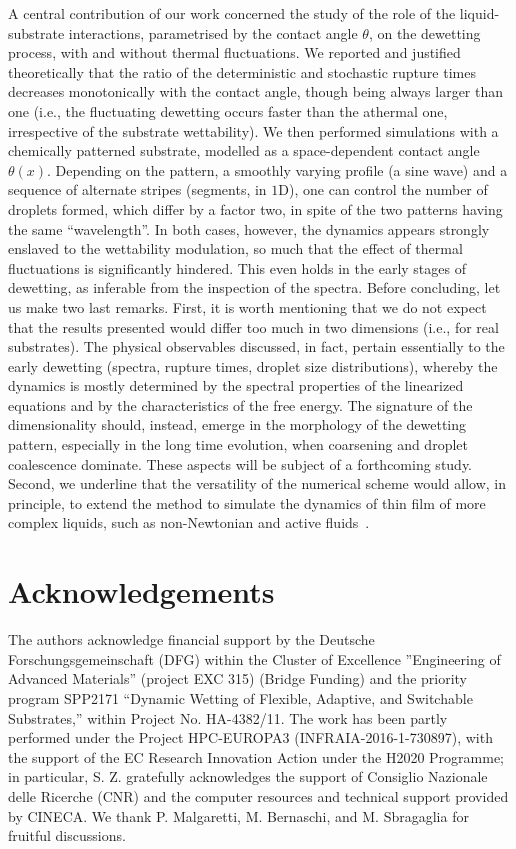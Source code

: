A central contribution of our work concerned the study of the role of the liquid-substrate interactions, parametrised by the contact angle $\theta$, on the dewetting process, with and without thermal fluctuations.
We reported and justified theoretically that the ratio of the deterministic and stochastic rupture times decreases monotonically with the contact angle, though being always larger than one (i.e., the fluctuating dewetting occurs faster than the athermal one, irrespective of the substrate wettability).  
We then performed simulations with a chemically patterned substrate, modelled as a space-dependent contact angle $\theta(x)$. 
Depending on the pattern, a smoothly varying profile (a sine wave) and a sequence of alternate stripes (segments, in $1$D), one can control the number of droplets formed, which differ by a factor two, in spite of the two patterns having the same ``wavelength''.
In both cases, however, the dynamics appears strongly enslaved to the wettability modulation, so much that the effect of thermal fluctuations is significantly hindered. This even holds in the early stages of dewetting, as inferable from the inspection of the spectra.
Before concluding, let us make two last remarks. 
First, it is worth mentioning that we do not expect that the results presented would differ too much in two dimensions (i.e., for real substrates).
The physical observables discussed, in fact, pertain essentially to the early dewetting (spectra, rupture times, droplet size distributions), whereby the dynamics is mostly determined by the spectral properties of the linearized equations and by the characteristics of the free energy.
The signature of the dimensionality should, instead, emerge in the morphology of the dewetting pattern, especially in the long time evolution, when coarsening and droplet coalescence dominate. 
These aspects will be subject of a forthcoming study. 
Second, we underline that the versatility of the numerical scheme would allow, in principle, to extend the method to simulate the dynamics of thin film of more complex liquids, such as non-Newtonian and active fluids~\cite{eggersNonlinearDynamicsBreakup1997,carenzaLatticeBoltzmannMethods2019}.

\section{Acknowledgements}\label{sec:ack_two}
The authors acknowledge financial support by the Deutsche Forschungsgemeinschaft (DFG) within the Cluster of Excellence ''Engineering of Advanced Materials'' (project EXC 315) (Bridge Funding) and the priority program SPP2171 ``Dynamic Wetting of Flexible, Adaptive, and Switchable Substrates,'' within Project No. HA-4382/11. 
The work has been partly performed under the Project HPC-EUROPA3 (INFRAIA-2016-1-730897), with the support of the EC Research Innovation Action under the H2020 Programme; in particular, S. Z. gratefully acknowledges the support of Consiglio Nazionale delle Ricerche (CNR) and the computer resources and technical support provided by CINECA.
We thank P. Malgaretti, M. Bernaschi, and M. Sbragaglia for fruitful discussions.